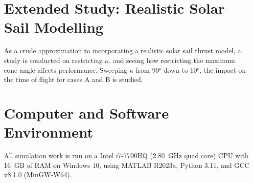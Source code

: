 
\section{Extended Study: Realistic Solar Sail Modelling}
As a crude approximation to incorporating a realistic solar sail thrust model, a study is conducted on restricting \(\kappa\), and seeing how restricting the maximum cone angle affects performance. Sweeping \(\kappa\) from \ang{90} down to \ang{10}, the impact on the time of flight for cases A and B is studied.

\section{Computer and Software Environment}
All simulation work is run on a Intel i7-7700HQ (\qty{2.80}{GHz} quad core) CPU with \qty{16}{GB} of RAM on Windows 10, using MATLAB R2023a, Python 3.11, and GCC v8.1.0 (MinGW-W64).

